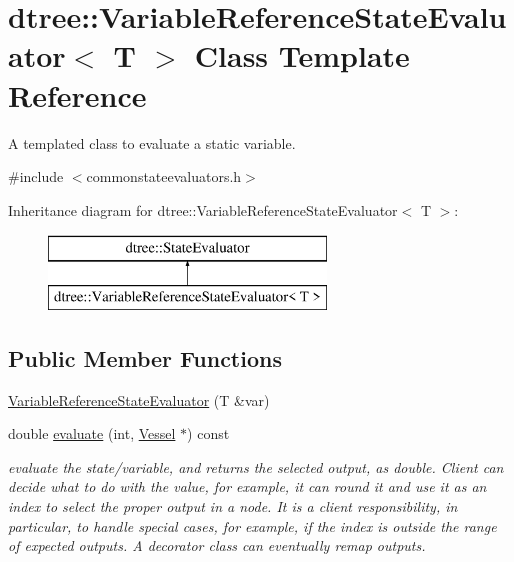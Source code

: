 \hypertarget{classdtree_1_1_variable_reference_state_evaluator}{}\section{dtree\+::Variable\+Reference\+State\+Evaluator$<$ T $>$ Class Template Reference}
\label{classdtree_1_1_variable_reference_state_evaluator}


A templated class to evaluate a static variable.  




{\ttfamily \#include $<$commonstateevaluators.\+h$>$}

Inheritance diagram for dtree\+::Variable\+Reference\+State\+Evaluator$<$ T $>$\+:\begin{figure}[H]
\begin{center}
\leavevmode
\includegraphics[height=2.000000cm]{d4/d1a/classdtree_1_1_variable_reference_state_evaluator}
\end{center}
\end{figure}
\subsection*{Public Member Functions}
\begin{DoxyCompactItemize}
\item 
\mbox{\hyperlink{classdtree_1_1_variable_reference_state_evaluator_a6c73b216db648dca939d02cec587a103}{Variable\+Reference\+State\+Evaluator}} (T \&var)
\item 
double \mbox{\hyperlink{classdtree_1_1_variable_reference_state_evaluator_a94e2383713ab366e325b9c55dd694463}{evaluate}} (int, \mbox{\hyperlink{class_vessel}{Vessel}} $\ast$) const
\begin{DoxyCompactList}\small\item\em evaluate the state/variable, and returns the selected output, as double. Client can decide what to do with the value, for example, it can round it and use it as an index to select the proper output in a node. It is a client responsibility, in particular, to handle special cases, for example, if the index is outside the range of expected outputs. A decorator class can eventually remap outputs. \end{DoxyCompactList}\end{DoxyCompactItemize}


